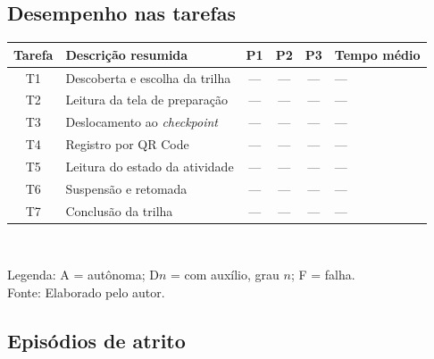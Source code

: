 
\subsection{Desempenho nas tarefas}

\begin{quadro}[htb]
\centering
\caption{Conclusão das tarefas na Rodada 1}
\label{quad:res_tarefas_r1}
\footnotesize
\begin{tabular}{c p{3.2cm} c c c p{2.6cm}}
\toprule
\textbf{Tarefa} & \textbf{Descrição resumida} & \textbf{P1} & \textbf{P2} &
\textbf{P3} & \textbf{Tempo médio} \\
\midrule
T1 & Descoberta e escolha da trilha & --- & --- & --- & --- \\
T2 & Leitura da tela de preparação & --- & --- & --- & --- \\
T3 & Deslocamento ao \textit{checkpoint} & --- & --- & --- & --- \\
T4 & Registro por QR Code & --- & --- & --- & --- \\
T5 & Leitura do estado da atividade & --- & --- & --- & --- \\
T6 & Suspensão e retomada & --- & --- & --- & --- \\
T7 & Conclusão da trilha & --- & --- & --- & --- \\
\bottomrule
\end{tabular}
\\[4pt]
\begin{flushleft}
Legenda: A = autônoma; D$n$ = com auxílio, grau $n$; F = falha.\\
Fonte: Elaborado pelo autor.
\end{flushleft}
\end{quadro}

\subsection{Episódios de atrito}



